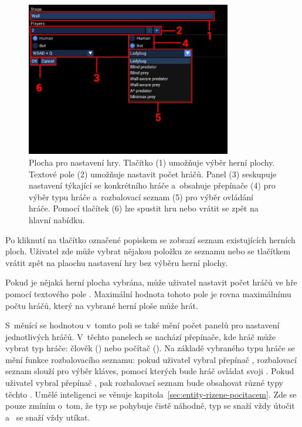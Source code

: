 \begin{figure}[ht]
    \centering
    \includegraphics[width=0.8\textwidth]{doc/obrazky-figures/game-setup.pdf}
    \caption{Plocha pro nastavení hry. Tlačítko (1) umožňuje výběr herní plochy. Textové pole (2) umožňuje nastavit počet hráčů. Panel (3) seskupuje nastavení týkající se konkrétního hráče a~obsahuje přepínače (4) pro výběr typu hráče a~rozbalovací seznam (5) pro výběr ovládání hráče. Pomocí tlačítek (6) lze spustit hru nebo vrátit se zpět na hlavní nabídku.}
    \label{fig:game-setup}
\end{figure}

Po kliknutí na tlačítko označené popiskem  se zobrazí seznam existujících herních ploch. Uživatel zde může vybrat nějakou položku ze seznamu nebo se tlačítkem  vrátit zpět na plaochu nastavení hry bez výběru herní plochy.

Pokud je nějaká herní plocha vybrána, může uživatel nastavit počet hráčů ve hře pomocí textového pole . Maximální hodnota tohoto pole je rovna maximálnímu počtu hráčů, který na vybrané herní ploše může hrát.

S~měnící se hodnotou v~tomto poli se také mění počet panelů pro nastavení jednotlivých hráčů. V~těchto panelech se nachází přepínače, kde hráč může vybrat typ hráče: člověk () nebo počítač (). Na základě vybraného typu hráče se mění funkce rozbalovacího seznamu: pokud uživatel vybral přepínač , rozbalovací seznam slouží pro výběr kláves, pomocí kterých bude hráč ovládat svoji . Pokud uživatel vybral přepínač , pak rozbalovací seznam bude obsahovat různé typy těchto . Umělé inteligenci se věnuje kapitola~\ref{sec:entity-rizene-pocitacem}. Zde se pouze zmíním o~tom, že typ  se pohybuje čistě náhodně, typ  se snaží vždy útočit a~ se snaží vždy utíkat.


